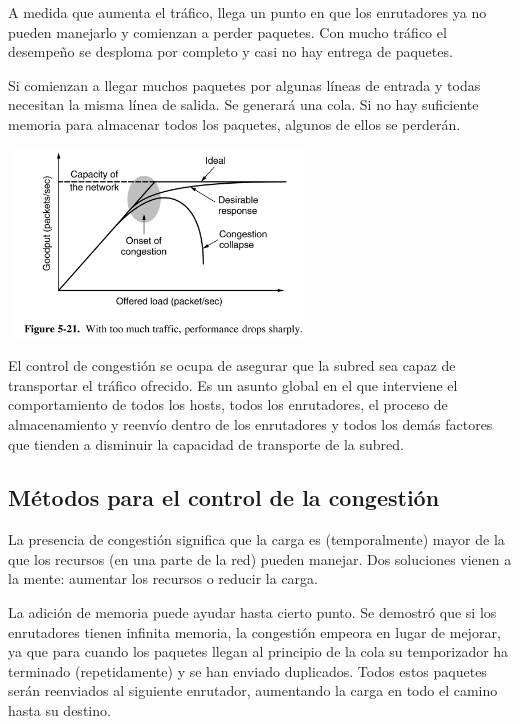 	\par A medida que aumenta el tráfico, llega un punto en que los enrutadores ya no pueden manejarlo y comienzan a perder paquetes. Con mucho tráfico el desempeño se desploma por completo y casi no hay entrega de paquetes.

	\par Si comienzan a llegar muchos paquetes por algunas líneas de entrada y todas necesitan la misma línea de salida. Se generará una cola. Si no hay suficiente memoria para almacenar todos los paquetes, algunos de ellos se perderán.
	
	\begin{center}
			\includegraphics[width=8cm, height=5cm]{./imagenes/congestion.png} 
	\end{center}

	\par El control de congestión se ocupa de asegurar que la subred sea capaz de transportar el tráfico ofrecido. Es un asunto global en el que interviene el comportamiento de todos los hosts, todos los enrutadores, el proceso de almacenamiento y reenvío dentro de los enrutadores y todos los demás factores que tienden a disminuir la capacidad de transporte de la subred.

\subsection{Métodos para el control de la congestión}

	\par La presencia de congestión significa que la carga es (temporalmente) mayor de la que los recursos (en una parte de la red) pueden manejar. Dos soluciones vienen a la mente: aumentar los recursos o reducir la carga.
	
	\par La adición de memoria puede ayudar hasta cierto punto. Se demostró que si los enrutadores tienen infinita memoria, la congestión empeora en lugar de mejorar, ya que para cuando los paquetes llegan al principio de la cola su temporizador ha terminado (repetidamente) y se han enviado duplicados. Todos estos paquetes serán reenviados al siguiente enrutador, aumentando la carga en todo el camino hasta su destino.

